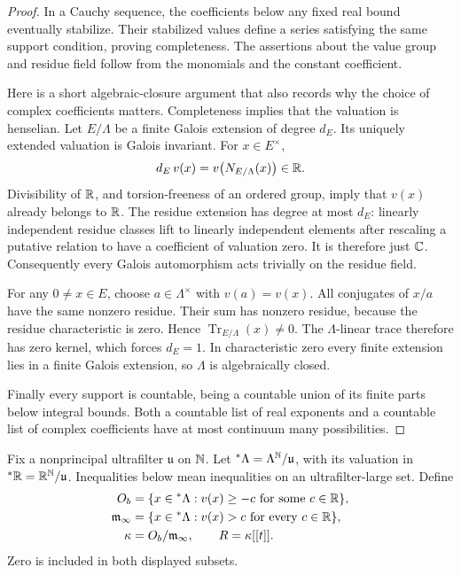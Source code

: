 \begin{proof}
In a Cauchy sequence, the coefficients below any fixed real bound
eventually stabilize.  Their stabilized values define a series satisfying
the same support condition, proving completeness.  The assertions about
the value group and residue field follow from the monomials and the
constant coefficient.

Here is a short algebraic-closure argument that also records why the
choice of complex coefficients matters.  Completeness implies that the
valuation is henselian.  Let \(E/\Lambda\) be a finite Galois extension of
degree \(d_E\).  Its uniquely extended valuation is Galois invariant.
For \(x\in E^\times\),
\[
 d_E\,v(x)=v\bigl(N_{E/\Lambda}(x)\bigr)\in\mathbb R.
\]
Divisibility of \(\mathbb R\), and torsion-freeness of an ordered group, imply
that \(v(x)\) already belongs to \(\mathbb R\).  The residue extension has degree
at most \(d_E\): linearly independent residue classes lift to linearly
independent elements after rescaling a putative relation to have a
coefficient of valuation zero.  It is therefore just \(\mathbb C\).
Consequently every Galois automorphism acts trivially on the residue
field.

For any \(0\ne x\in E\), choose \(a\in\Lambda^\times\) with \(v(a)=v(x)\).
All conjugates of \(x/a\) have the same nonzero residue.  Their sum has
nonzero residue, because the residue characteristic is zero.  Hence
\(\operatorname{Tr}_{E/\Lambda}(x)\ne0\).  The \(\Lambda\)-linear trace
therefore has zero kernel, which forces \(d_E=1\).  In characteristic
zero every finite extension lies in a finite Galois extension, so
\(\Lambda\) is algebraically closed.

Finally every support is countable, being a countable union of its finite
parts below integral bounds.  Both a countable list of real exponents and
a countable list of complex coefficients have at most continuum many
possibilities.
\end{proof}

Fix a nonprincipal ultrafilter \(\mathfrak u\) on \(\mathbb N\).  Let
\({}^*\Lambda=\Lambda^{\mathbb N}/\mathfrak u\), with its valuation in
\({}^*\mathbb R=\mathbb R^{\mathbb N}/\mathfrak u\).  Inequalities below mean inequalities on
an ultrafilter-large set.  Define
\begin{align}
 O_b&=\{x\in{}^*\Lambda:v(x)\ge-c
                         \text{ for some }c\in\mathbb R\},\nonumber\\
 \mathfrak m_\infty&=\{x\in{}^*\Lambda:v(x)>c
                         \text{ for every }c\in\mathbb R\},\nonumber\\
 \kappa&=O_b/\mathfrak m_\infty,\qquad R=\kappa[[t]].
 \label{cat:coefficient-rings}
\end{align}
Zero is included in both displayed subsets.

